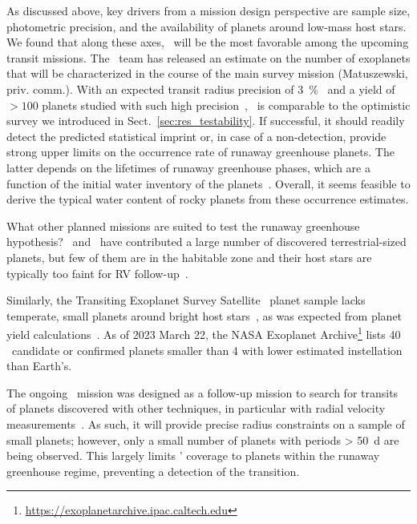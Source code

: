 \documentclass[twocolumn,twocolappendix]{aastex631}
\begin{document}
As discussed above, key drivers from a mission design perspective are sample size, photometric precision, and the availability of planets around low-mass host stars.
We found that along these axes, \plato\ will be the most favorable among the upcoming transit missions.
The \plato\ team has released an estimate on the number of exoplanets that will be characterized in the course of the main survey mission (Matuszewski, priv. comm.).
With an expected transit radius precision of \SI{3}{\percent}~\citep{plato2017} and a yield of $> 100$ planets studied with such high precision~\citep{Rauer2021}, \plato\ is comparable to the optimistic survey we introduced in Sect.~\ref{sec:res_testability}.
If successful, it should readily detect the predicted statistical imprint or, in case of a non-detection, provide strong upper limits on the occurrence rate of runaway greenhouse planets.
The latter depends on the lifetimes of runaway greenhouse phases, which are a function of the initial water inventory of the planets~\citep{Hamano2015}.
Overall, it seems feasible to derive the typical water content of rocky planets from these occurrence estimates.

What other planned missions are suited to test the runaway greenhouse hypothesis?
\kepler\ and \ktwo\ have contributed a large number of discovered terrestrial-sized planets, but few of them are in the habitable zone and their host stars are typically too faint for RV follow-up~\citep{Dressing2015}.

Similarly, the Transiting Exoplanet Survey Satellite~\citep[\tess,][]{Ricker2014a} planet sample lacks temperate, small planets around bright host stars~\citep{Ment2023}, as was expected from planet yield calculations~\citep{Barclay2018}.
As of 2023 March 22, the NASA Exoplanet Archive\footnote{\url{https://exoplanetarchive.ipac.caltech.edu}} lists 40 \tess\ candidate or confirmed planets smaller than \SI{4}{\rEarth} with lower estimated instellation than Earth's.

The ongoing \cheops\ mission was designed as a follow-up mission to search for transits of planets discovered with other techniques, in particular with radial velocity measurements~\citep{Benz2021}.
As such, it will provide precise radius constraints on a sample of small planets; however, only a small number of planets with periods \SI{> 50}{\day} are being observed.
This largely limits \cheops' coverage to planets within the runaway greenhouse regime, preventing a detection of the transition.
\end{document}
